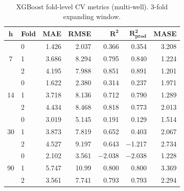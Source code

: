 \documentclass[10pt]{article}
\begin{document}
\begin{table}[ht]
\centering
\caption{XGBoost fold-level CV metrics (multi-well). 3-fold expanding window.}
\label{tab:xgboost_cv_folds}
\small
\setlength{\tabcolsep}{3pt}
\begin{tabular}{@{}cl rrrrr @{}}
\toprule
$\boldsymbol{h}$ & \textbf{Fold} & \textbf{MAE} & \textbf{RMSE} & $\boldsymbol{R^2}$ & $\boldsymbol{R^2_\text{prod}}$ & \textbf{MASE} \\
\midrule
\multirow{3}{*}{7}
 & 0 & 1.426 & 2.037 &  0.366 &  0.354 & 3.208 \\
 & 1 & 3.686 & 8.294 &  0.795 &  0.840 & 1.224 \\
 & 2 & 4.195 & 7.988 &  0.851 &  0.891 & 1.201 \\
\midrule
\multirow{3}{*}{14}
 & 0 & 1.622 & 2.380 &  0.314 &  0.237 & 1.971 \\
 & 1 & 3.718 & 8.136 &  0.712 &  0.790 & 1.289 \\
 & 2 & 4.434 & 8.468 &  0.818 &  0.773 & 2.013 \\
\midrule
\multirow{3}{*}{30}
 & 0 & 3.019 & 5.145 &  0.191 &  0.129 & 1.514 \\
 & 1 & 3.873 & 7.819 &  0.652 &  0.403 & 2.067 \\
 & 2 & 4.527 & 9.197 &  0.643 & $-$1.217 & 2.734 \\
\midrule
\multirow{3}{*}{90}
 & 0 & 2.102 & 3.561 & $-$2.038 & $-$2.038 & 1.228 \\
 & 1 & 5.747 & 10.99 &  0.800 &  0.800 & 3.369 \\
 & 2 & 3.561 & 7.741 &  0.793 &  0.793 & 2.294 \\
\bottomrule
\end{tabular}
\end{table}
\end{document}
